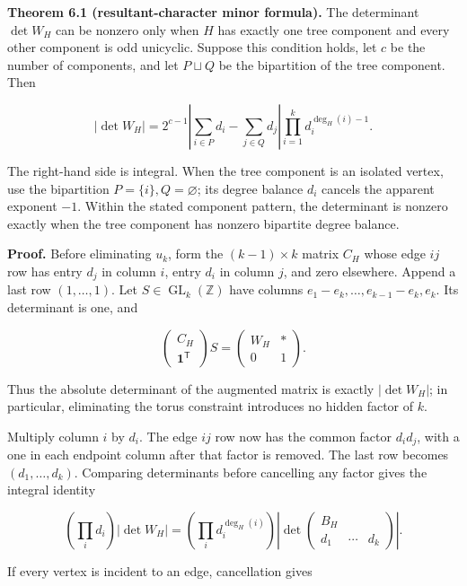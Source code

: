 \documentclass[
  11pt,
  a4paper,
]{article}
\begin{document}
\textbf{Theorem 6.1 (resultant-character minor formula).} The
determinant \(\det W_H\) can be nonzero only when \(H\) has exactly one
tree component and every other component is odd unicyclic. Suppose this
condition holds, let \(c\) be the number of components, and let
\(P\sqcup Q\) be the bipartition of the tree component. Then

\[
 \boxed{
 |\det W_H|
 =2^{c-1}
 \left|\sum_{i\in P}d_i-\sum_{j\in Q}d_j\right|
 \prod_{i=1}^kd_i^{\deg_H(i)-1}.
 }
\]

The right-hand side is integral. When the tree component is an isolated
vertex, use the bipartition \(P=\{i\},Q=\varnothing\); its degree
balance \(d_i\) cancels the apparent exponent \(-1\). Within the stated
component pattern, the determinant is nonzero exactly when the tree
component has nonzero bipartite degree balance.

\textbf{Proof.} Before eliminating \(u_k\), form the \((k-1)\times k\)
matrix \(C_H\) whose edge \(ij\) row has entry \(d_j\) in column \(i\),
entry \(d_i\) in column \(j\), and zero elsewhere. Append a last row
\((1,\ldots,1)\). Let \(S\in\operatorname{GL}_k(\mathbb Z)\) have
columns \(e_1-e_k,\ldots,e_{k-1}-e_k,e_k\). Its determinant is one, and

\[
 \begin{pmatrix}C_H\\ \mathbf 1^{\mathsf T}\end{pmatrix}S
 =\begin{pmatrix}W_H&*\\0&1\end{pmatrix}.
\]

Thus the absolute determinant of the augmented matrix is exactly
\(|\det W_H|\); in particular, eliminating the torus constraint
introduces no hidden factor of \(k\).

Multiply column \(i\) by \(d_i\). The edge \(ij\) row now has the common
factor \(d_id_j\), with a one in each endpoint column after that factor
is removed. The last row becomes \((d_1,\ldots,d_k)\). Comparing
determinants before cancelling any factor gives the integral identity

\[
 \left(\prod_i d_i\right)|\det W_H|
 =\left(\prod_i d_i^{\deg_H(i)}\right)
 \left|
 \det\begin{pmatrix}
 B_H\\ d_1&\cdots&d_k
 \end{pmatrix}
 \right|.
\tag{6.1}
\]

If every vertex is incident to an edge, cancellation gives
\end{document}
